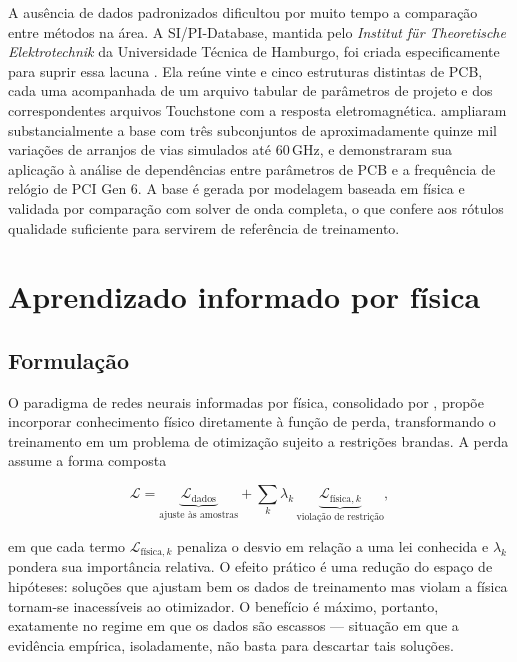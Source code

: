 A ausência de dados padronizados dificultou por muito tempo a comparação entre
métodos na área. A SI/PI-Database, mantida pelo \textit{Institut für Theoretische
Elektrotechnik} da Universidade Técnica de Hamburgo, foi criada especificamente
para suprir essa lacuna \citep{schierholz2021}. Ela reúne vinte e cinco
estruturas distintas de PCB, cada uma acompanhada de um arquivo tabular de
parâmetros de projeto e dos correspondentes arquivos Touchstone com a resposta
eletromagnética. \citet{hillebrecht2024} ampliaram substancialmente a base com
três subconjuntos de aproximadamente quinze mil variações de arranjos de vias
simulados até 60\,GHz, e demonstraram sua aplicação à análise de dependências
entre parâmetros de PCB e a frequência de relógio de PCI Gen 6. A base é
gerada por modelagem baseada em física e validada por comparação com solver de
onda completa, o que confere aos rótulos qualidade suficiente para servirem de
referência de treinamento.

\section{Aprendizado informado por física}
\label{sec:pinn}

\subsection{Formulação}

O paradigma de redes neurais informadas por física, consolidado por
\citet{raissi2019}, propõe incorporar conhecimento físico diretamente à função de
perda, transformando o treinamento em um problema de otimização sujeito a
restrições brandas. A perda assume a forma composta

\begin{equation}
\mathcal{L} = \underbrace{\mathcal{L}_{\text{dados}}}_{\text{ajuste às amostras}}
            + \sum_{k} \lambda_k \,
              \underbrace{\mathcal{L}_{\text{física},k}}_{\text{violação de restrição}},
\label{eq:pinn}
\end{equation}

\noindent em que cada termo $\mathcal{L}_{\text{física},k}$ penaliza o desvio em
relação a uma lei conhecida e $\lambda_k$ pondera sua importância relativa. O
efeito prático é uma redução do espaço de hipóteses: soluções que ajustam bem os
dados de treinamento mas violam a física tornam-se inacessíveis ao otimizador. O
benefício é máximo, portanto, exatamente no regime em que os dados são escassos —
situação em que a evidência empírica, isoladamente, não basta para descartar tais
soluções.

